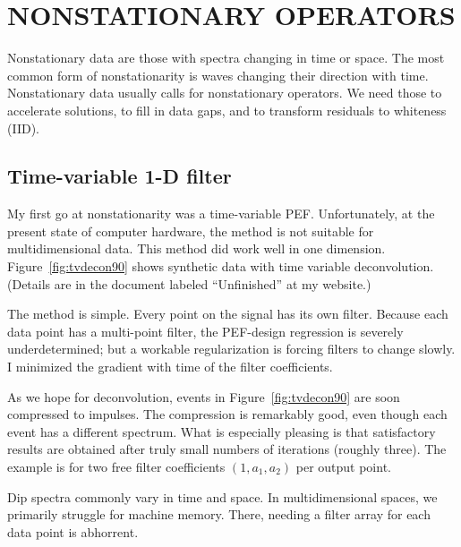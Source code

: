 \section{NONSTATIONARY OPERATORS}

Nonstationary data are those with spectra changing in time or space.
The most common form of nonstationarity is waves changing their direction with time.
Nonstationary data usually calls for nonstationary operators.
We need those to accelerate solutions,
to fill in data gaps,
and to transform residuals to whiteness (IID).

\subsection{Time-variable 1-D filter}
My first go at nonstationarity was a time-variable PEF.
Unfortunately,
at the present state of computer hardware,
the method is not suitable for multidimensional data.
This method did work well in one dimension.
Figure~\ref{fig:tvdecon90} shows synthetic data with time variable deconvolution.
(Details are in the document labeled ``Unfinished'' at my website.)

\par
The method is simple.
Every point on the signal has its own filter.
Because each data point has a multi-point filter,
the PEF-design regression is severely underdetermined;
but a workable regularization is forcing filters to change slowly.
I minimized the gradient with time of the filter coefficients.

\par
As we hope for deconvolution,
events in Figure~\ref{fig:tvdecon90} are soon compressed to impulses.
The compression is remarkably good,
even though each event has a different spectrum.
What is especially pleasing is that satisfactory results
are obtained after truly small numbers of iterations (roughly three).
The example is for two free filter coefficients $(1,a_1,a_2)$ per output point.

\par
Dip spectra commonly vary in time and space.
In multidimensional spaces,
we primarily struggle for machine memory.
There,
needing a filter array for each data point is abhorrent.


